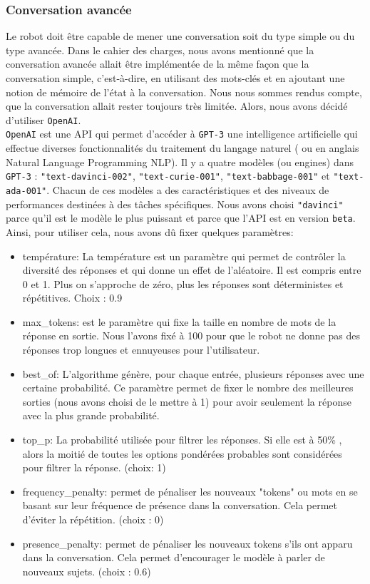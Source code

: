 \documentclass[a4paper,french]{article}
\begin{document}
\subsubsection{Conversation avancée} 
Le robot doit être capable de mener une conversation soit du type simple ou du type avancée. Dans le cahier des charges, nous avons mentionné que la conversation avancée allait être implémentée de la même façon que la conversation simple, c'est-à-dire, en utilisant des mots-clés et en ajoutant  une notion de mémoire de l’état à la conversation. Nous nous sommes rendus compte, que la conversation allait rester toujours très limitée. Alors, nous avons décidé d'utiliser \texttt{OpenAI}.\\
\texttt{OpenAI} est une API qui permet d'accéder à \texttt{GPT-3} une intelligence artificielle qui effectue diverses fonctionnalités du traitement du langage naturel ( ou en anglais Natural Language Programming NLP). Il y a quatre modèles (ou engines) dans \texttt{GPT-3} : \texttt{"text-davinci-002"}, \texttt{"text-curie-001"}, \texttt{"text-babbage-001"} et \texttt{"text-ada-001"}. Chacun de ces modèles a des caractéristiques et des niveaux de performances destinées à des tâches spécifiques. Nous avons choisi \texttt{"davinci"} parce qu'il est le modèle le plus puissant et parce que l'API est en version \texttt{beta}. \\
Ainsi, pour utiliser cela, nous avons dû fixer quelques paramètres:

\begin{itemize}
    \item température: La température est un paramètre qui permet de contrôler la diversité des réponses et qui donne un effet de l'aléatoire. Il est compris entre 0 et 1. Plus on s'approche de zéro, plus les réponses sont déterministes et répétitives. Choix : 0.9
    \item max\_tokens: est le paramètre qui fixe la taille en nombre de mots de la réponse en sortie. Nous l'avons fixé à 100 pour que le robot ne donne pas des réponses trop longues et ennuyeuses pour l'utilisateur.
    \item best\_of: L'algorithme génère, pour chaque entrée, plusieurs réponses avec une certaine probabilité. Ce paramètre permet de fixer le nombre des meilleures sorties (nous avons choisi de le mettre à 1) pour avoir seulement la réponse avec la plus grande probabilité.
    \item top\_p: La probabilité utilisée pour filtrer les réponses. Si elle est à 50\% , alors la moitié de toutes les options pondérées probables sont considérées pour filtrer la réponse. (choix: 1)
    \item frequency\_penalty: permet de pénaliser les nouveaux "tokens" ou mots en se basant sur leur fréquence de présence dans la conversation. Cela permet d'éviter la répétition. (choix : 0)
    \item presence\_penalty: permet de pénaliser les nouveaux tokens s'ils ont apparu dans la conversation. Cela permet d'encourager le modèle à parler de nouveaux sujets. (choix : 0.6)
\end{itemize}
\end{document}
